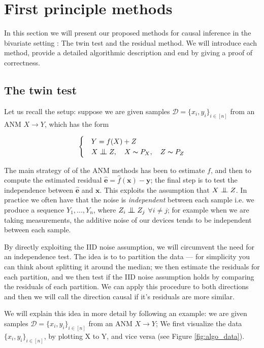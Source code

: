 
\chapter{First principle methods}


In this section we will present our proposed methods for causal inference in the 
bivariate setting : The twin test and the residual method. We will introduce each method, 
provide a detailed algorithmic description and end by giving a proof of correctness. 


\section{The twin test}

Let us recall the setup: 
suppose we are given samples $\mathcal{D} = \{x_i, y_i\}_{i \in [n]}$ from an ANM $X \rightarrow Y$, which has the form

\[
    \begin{cases} 
        & Y = f(X) + Z \\
        & X \bigCI Z,\quad X \thicksim P_X,\quad Z \thicksim P_{Z}  
     \end{cases}  
\]

The main strategy of of the ANM methods has been to estimate $f$, and then to compute the estimated
residual $\hat{\mathbf{e}} = \hat{f}(\mathbf{x}) - \mathbf{y}$; the final step is to test the independence between $\hat{\mathbf{e}}$ and $\mathbf{x}$. This exploits 
the assumption that $X \bigCI Z$. In practice we often have that the noise is \textit{independent} between each sample
i.e. we produce a sequence $Y_1, ..., Y_n$, where $Z_i \bigCI Z_j$ $\forall i \neq j$; for example when we are 
taking measurements, the additive noise of our devices tends to be independent between each sample.

By directly exploiting the IID noise assumption, we will circumvent the need for an independence test. The 
idea is to to partition the data ---  for simplicity you can think about splitting it around the median; we 
then estimate the residuals for each partition, and we then test if the IID noise assumption holds by comparing
the residuals of each partition. We can apply this procedure to both directions and then we will call the 
direction causal if it's residuals are more similar. 

We will explain this idea in more detail by following an example: we are given samples 
$\mathcal{D} = \{x_i, y_i\}_{i \in [n]}$ from an ANM $X \rightarrow Y$; 
We first visualize the data $\{x_i, y_i\}_{i \in [n]}$, by plotting
X to Y, and vice versa (see Figure \ref{fig:algo_data}). 

